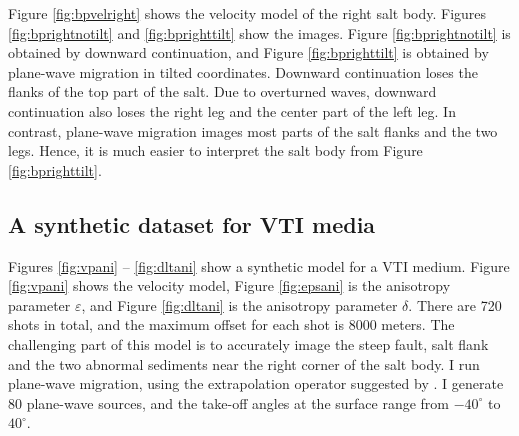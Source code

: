 \par
Figure \ref{fig:bpvelright} shows the velocity model of the right salt body.
Figures \ref{fig:bprightnotilt} and \ref{fig:bprighttilt} show the images. 
Figure \ref{fig:bprightnotilt} is obtained by downward continuation, and 
Figure \ref{fig:bprighttilt} is obtained by plane-wave migration in tilted coordinates. Downward continuation loses the flanks 
of the top part of the salt. Due to overturned waves, downward continuation also loses the right leg and the center 
part of the left leg. In contrast, plane-wave migration images most parts of the salt flanks and the two legs. 
Hence, it is much easier to interpret the salt body from Figure \ref{fig:bprighttilt}.


\subsection{A synthetic dataset for VTI media}
Figures \ref{fig:vpani} -- \ref{fig:dltani} show a synthetic model for a VTI medium. Figure \ref{fig:vpani} shows the
velocity model, Figure \ref{fig:epsani} is the anisotropy parameter $\varepsilon$, and Figure \ref{fig:dltani}
is the anisotropy parameter $\delta$. There are 720 shots in total, and the maximum offset for each shot
is 8000 meters. The challenging part of this model is to accurately image the steep fault, salt flank and the
two abnormal sediments  near the right corner of the salt body. I run plane-wave migration, 
using the extrapolation operator suggested by . 
I generate 80 plane-wave sources, and the take-off angles at the surface range from $-40^\circ$ to $40^\circ$. 



